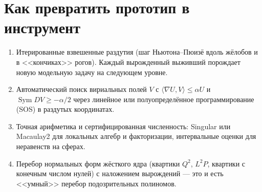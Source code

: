 \documentclass[11pt,a4paper]{article}
\DeclareMathOperator{\Sym}{Sym}
\begin{document}
\section{Как превратить прототип в инструмент}
\begin{enumerate}[leftmargin=*]
\item Итерированные взвешенные раздутия (шаг Ньютона--Пюизё вдоль жёлобов и в <<кончиках>> рогов).
Каждый вырожденный выживший порождает новую модельную задачу на следующем уровне.
\item Автоматический поиск вириальных полей $V$ с $\langle\nabla U,V\rangle\le\alpha U$ и $\Sym DV\ge-\alpha/2$
через линейное или полуопределённое программирование (SOS) в раздутых координатах.
\item Точная арифметика и сертифицированная численность: Singular или Macaulay2 для локальных алгебр и
факторизации, интервальные оценки для неравенств на сферах.
\item Перебор нормальных форм жёсткого ядра (квартики $Q^2$, $L^2P$, квартики с конечным числом нулей) с
наложением вырождений --- это и есть <<умный>> перебор подозрительных полиномов.
\end{enumerate}
\end{document}
